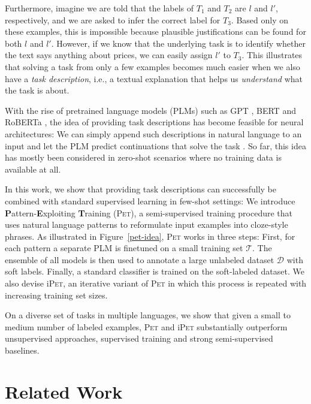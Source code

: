 Furthermore, imagine we are told that the labels of $T_1$ and $T_2$ are $l$ and $l'$, respectively, and we are asked to infer the correct label for $T_3$. Based only on these examples, this is impossible  because plausible justifications can be found for both $l$ and $l'$. However, if we know that the underlying task is to identify whether the text says anything about prices, we can easily assign $l'$ to $T_3$. This illustrates that solving a task from only a few examples becomes much easier when we also have a \emph{task description}, i.e., a textual explanation that helps us \emph{understand} what the task is about.

With the rise of pretrained language models (PLMs) such as GPT \citep{radford2018improving}, BERT \citep{devlin2018bert} and RoBERTa \citep{liu2019roberta}, the idea of providing task descriptions has become feasible for neural architectures: We can simply append such descriptions in natural language to an input and let the PLM predict continuations that solve the task \citep{radford2018language,puri2019zeroshot}. So far, this idea has mostly been considered in zero-shot scenarios where no training data is available at all.

In this work, we show that providing task descriptions can successfully be combined with standard supervised learning in few-shot settings: We introduce \textbf{P}attern-\textbf{E}xploiting \textbf{T}raining (\textsc{Pet}), a semi-supervised training procedure that uses natural language patterns to reformulate input examples into cloze-style phrases. As illustrated in Figure~\ref{pet-idea}, \textsc{Pet} works in three steps: First, for each pattern a separate PLM is finetuned on a small training set $\mathcal{T}$. The ensemble of all models is then used to annotate a large unlabeled dataset $\mathcal{D}$ with soft labels. Finally, a standard classifier is trained on the soft-labeled dataset. We also devise i\textsc{Pet}, an iterative variant of \textsc{Pet} in which this process is repeated with increasing training set sizes.

On a diverse set of tasks in multiple languages, we show that given a small to medium number of labeled examples, \textsc{Pet} and i\textsc{Pet} substantially outperform unsupervised approaches, supervised training and strong semi-supervised baselines.

\section{Related Work}

